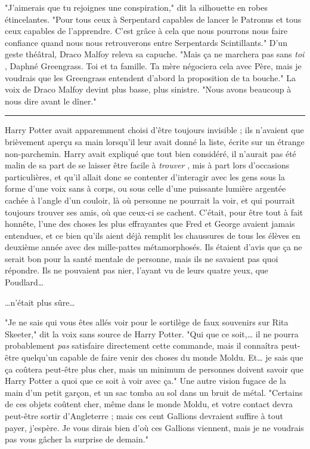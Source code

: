 "J'aimerais que tu rejoignes une conspiration," dit la silhouette en robes étincelantes. "Pour tous ceux à Serpentard capables de lancer le Patronus et tous ceux capables de l'apprendre. C'est grâce à cela que nous pourrons nous faire confiance quand nous nous retrouverons entre Serpentards Scintillants." D'un geste théâtral, Draco Malfoy releva sa capuche. "Mais ça ne marchera pas sans \emph{toi} , Daphné Greengrass. Toi et ta famille. Ta mère négociera cela avec Père, mais je voudrais que les Greengrass entendent d'abord la proposition de ta bouche." La voix de Draco Malfoy devint plus basse, plus sinistre. "Nous avons beaucoup à nous dire avant le dîner."
\par\noindent\rule{\textwidth}{0.4pt}
Harry Potter avait apparemment choisi d'être toujours invisible ; ils n'avaient que brièvement aperçu sa main lorsqu'il leur avait donné la liste, écrite sur un étrange non-parchemin. Harry avait expliqué que tout bien considéré, il n'aurait pas été malin de sa part de se laisser être facile à \emph{trouver} , mis à part lors d'occasions particulières, et qu'il allait donc se contenter d'interagir avec les gens sous la forme d'une voix sans à corps, ou sous celle d'une puissante lumière argentée cachée à l'angle d'un couloir, là où personne ne pourrait la voir, et qui pourrait toujours trouver ses amis, où que ceux-ci se cachent. C'était, pour être tout à fait honnête, l'une des choses les plus effrayantes que Fred et George avaient jamais entendues, et ce bien qu'ils aient déjà remplit les chaussures de tous les élèves en deuxième année avec des mille-pattes métamorphosés. Ils étaient d'avis que ça ne serait bon pour la santé mentale de personne, mais ils ne savaient pas quoi répondre. Ils ne pouvaient pas nier, l'ayant vu de leurs quatre yeux, que Poudlard…

…n'était plus sûre…

"Je ne sais qui vous êtes allés voir pour le sortilège de faux souvenirs sur Rita Skeeter," dit la voix sans source de Harry Potter. "Qui que ce soit,… il ne pourra probablement \emph{pas}  satisfaire directement cette commande, mais il connaîtra peut-être quelqu'un capable de faire venir des choses du monde Moldu. Et… je sais que ça coûtera peut-être plus cher, mais un minimum de personnes doivent savoir que Harry Potter a quoi que ce soit à voir avec ça." Une autre vision fugace de la main d'un petit garçon, et un sac tomba au sol dans un bruit de métal. "Certains de ces objets coûtent cher, même dans le monde Moldu, et votre contact devra peut-être sortir d'Angleterre ; mais ces cent Gallions devraient suffire à tout payer, j'espère. Je vous dirais bien d'où ces Gallions viennent, mais je ne voudrais pas vous gâcher la surprise de demain."

